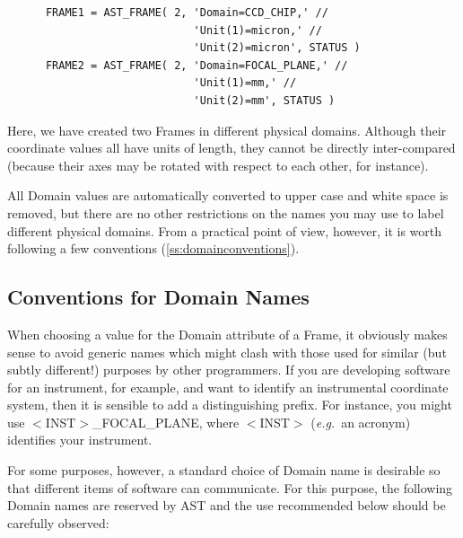 \documentclass[twoside,11pt]{article}
\newcommand{\htmlref}[2]{#1}
\newcommand{\secref}[1]{\S\ref{#1}}
\renewcommand{\secref}[1]{\ref{#1}}
\begin{document}
\small
\begin{verbatim}
      FRAME1 = AST_FRAME( 2, 'Domain=CCD_CHIP,' //
                             'Unit(1)=micron,' //
                             'Unit(2)=micron', STATUS )
      FRAME2 = AST_FRAME( 2, 'Domain=FOCAL_PLANE,' //
                             'Unit(1)=mm,' //
                             'Unit(2)=mm', STATUS )
\end{verbatim}
\normalsize

Here, we have created two Frames in different physical
domains. Although their coordinate values all have units of length,
they cannot be directly inter-compared (because their axes may be
rotated with respect to each other, for instance).

All Domain values are automatically converted to upper case and white
space is removed, but there are no other restrictions on the names you
may use to label different physical domains. From a practical point of
view, however, it is worth following a few conventions
(\secref{ss:domainconventions}).

\subsection{\label{ss:domainconventions}Conventions for Domain Names}

When choosing a value for the \htmlref{Domain}{Domain} attribute of a \htmlref{Frame}{Frame}, it
obviously makes sense to avoid generic names which might clash with
those used for similar (but subtly different!) purposes by other
programmers. If you are developing software for an instrument, for
example, and want to identify an instrumental coordinate system, then
it is sensible to add a distinguishing prefix. For instance, you might
use $<$INST$>$\_FOCAL\_PLANE, where $<$INST$>$ ({\em{e.g.}}\ an
acronym) identifies your instrument.

For some purposes, however, a standard choice of Domain name is
desirable so that different items of software can communicate. For
this purpose, the following Domain names are reserved by AST and the
use recommended below should be carefully observed:
\end{document}
